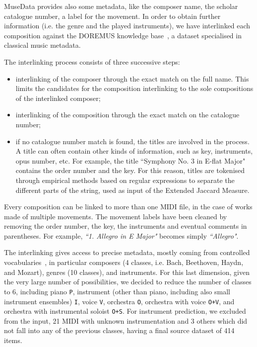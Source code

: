 \documentclass{article}
\begin{document}



MuseData provides also some metadata, like the composer name, the scholar catalogue number, a label for the movement. In order to 
obtain further information (i.e. the genre and the played instruments), we have interlinked each composition against the DOREMUS knowledge base~\citep{achichi2018doremus}, a dataset specialised in classical music metadata.

The interlinking process consists of three successive steps:
\begin{itemize}
    \item interlinking of the composer through the exact match on the full name. This limits the candidates for the composition interlinking to the sole compositions of the interlinked composer;
    \item interlinking of the composition through the exact match on the catalogue number;
    \item if no catalogue number match is found, the titles are involved in the process. A title can often contain other kinds of information, such as key, instruments, opus number, etc. For example, the title ``Symphony No. 3 in E-flat Major" contains the order number and the key. For this reason, titles are tokenised through empirical methods based on regular expressions to separate the different parts of the string, used as input of the Extended Jaccard Measure.~\citep{tigrine2015lyam}
\end{itemize}

Every composition can be linked to more than one MIDI file, in the case of works made of multiple movements. The movement labels have been cleaned by removing the order number, the key, the instruments and eventual comments in parentheses. For example, \textit{``1. Allegro in E Major"} becomes simply \textit{``Allegro"}.

The interlinking gives access to precise metadata, mostly coming from controlled vocabularies~\citep{lisena2018vocabularies},
in particular composers (4 classes, i.e. Bach, Beethoven, Haydn, and Mozart), genres (10 classes), and instruments. For this last dimension, given the very large number of possibilities, we decided to reduce the number of classes to 6, including piano \texttt{P}, instrument (other than piano, including also small instrument ensembles) \texttt{I}, voice \texttt{V}, orchestra \texttt{O}, orchestra with voice \texttt{O+V}, and orchestra with instrumental soloist \texttt{O+S}. For instrument prediction, we excluded from the input, 21 MIDI with unknown instrumentation and 3 others which did not fall into any of the previous classes, having a final source dataset of 414 items. 
\end{document}
